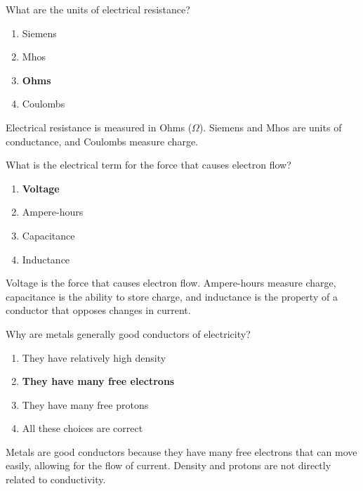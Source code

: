 \begin{tcolorbox}[colback=gray!10!white,colframe=black!75!black,title={T5A04}]
    What are the units of electrical resistance?
    \begin{enumerate}[label=\Alph*),noitemsep]
        \item Siemens
        \item Mhos
        \item \textbf{Ohms}
        \item Coulombs
    \end{enumerate}
\end{tcolorbox}
Electrical resistance is measured in Ohms (\(\Omega\)). Siemens and Mhos are units of conductance, and Coulombs measure charge.

\begin{tcolorbox}[colback=gray!10!white,colframe=black!75!black,title={T5A05}]
    What is the electrical term for the force that causes electron flow?
    \begin{enumerate}[label=\Alph*),noitemsep]
        \item \textbf{Voltage}
        \item Ampere-hours
        \item Capacitance
        \item Inductance
    \end{enumerate}
\end{tcolorbox}
Voltage is the force that causes electron flow. Ampere-hours measure charge, capacitance is the ability to store charge, and inductance is the property of a conductor that opposes changes in current.

\begin{tcolorbox}[colback=gray!10!white,colframe=black!75!black,title={T5A07}]
    Why are metals generally good conductors of electricity?
    \begin{enumerate}[label=\Alph*),noitemsep]
        \item They have relatively high density
        \item \textbf{They have many free electrons}
        \item They have many free protons
        \item All these choices are correct
    \end{enumerate}
\end{tcolorbox}
Metals are good conductors because they have many free electrons that can move easily, allowing for the flow of current. Density and protons are not directly related to conductivity.

